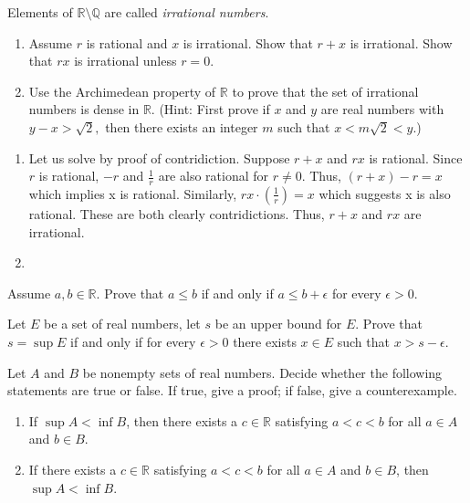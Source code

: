 \documentclass[12pt,letterpaper,boxed]{hmcpset}
\begin{document}
\begin{problem}[Exercise 4.6.]
Elements of $\mathbb{R}\setminus\mathbb{Q}$ are called \textit{irrational numbers}.
\begin{enumerate}
	\itemsep0em
	\item Assume $r$ is rational and $x$ is irrational. Show that $r + x$ is irrational. Show that $rx$ is irrational unless $r=0$.
	\item Use the Archimedean property of $\mathbb{R}$ to prove that the set of irrational numbers is dense in $\mathbb{R}.$ (Hint: First prove if $x$ and $y$ are real numbers with $y - x > \sqrt{2},$ then there exists an integer $m$ such that $x < m\sqrt{2} < y$.)
\end{enumerate}
\end{problem}

\begin{solution}
\begin{enumerate}
	\itemsep0em
	\item Let us solve by proof of contridiction. Suppose $r + x$ and $rx$ is rational. Since $r$ is rational, $-r$ and \(\frac{1}{r}\) are also rational for $r \neq 0$. Thus, $(r + x) - r = x$ which implies x is rational. 
	Similarly, $rx \cdot (\frac{1}{r}) = x$ which suggests x is also rational. These are both clearly contridictions. Thus, $r + x$ and $rx$ are irrational.
	\item 
\end{enumerate}
\end{solution}

\begin{problem}[Exercise 4.8.]
Assume $a, b \in \mathbb{R}.$ Prove that $a \leq b$ if and only if $a \leq b + \epsilon$ for every $\epsilon > 0.$
\end{problem}

\begin{solution}
\end{solution}

\begin{problem}[Exercise 4.9.]
Let $E$ be a set of real numbers, let $s$ be an upper bound for $E$. Prove that $s = \sup E$ if and only if for every $\epsilon > 0$ there exists $x \in E$ such that $x > s - \epsilon.$
\end{problem}

\begin{solution}
\end{solution}

\begin{problem}[Exercise 4.10.]
Let $A$ and $B$ be nonempty sets of real numbers. Decide whether the following statements are true or false. If true, give a proof; if false, give a counterexample.
\begin{enumerate}
	\itemsep0em
	\item If $\sup A < \inf B$, then there exists a $c \in \mathbb{R}$ satisfying $a < c < b$ for all $a \in A$ and $b \in B$.
	\item If there exists a $c\in \mathbb{R}$ satisfying $a < c < b$ for all $a \in A$ and $b \in B$, then $\sup A < \inf B$.
\end{enumerate}
\end{problem}

\begin{solution}
\end{solution}
\end{document}
